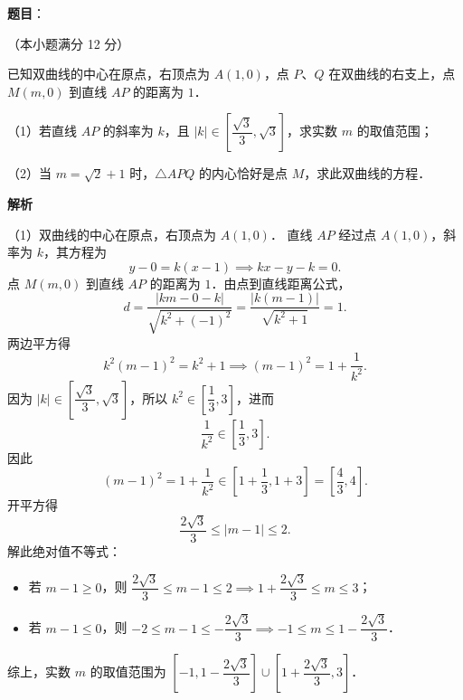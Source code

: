 \begin{answer}

\textbf{题目}：

（本小题满分 12 分）

已知双曲线的中心在原点，右顶点为 $A(1, 0)$，点 $P$、$Q$ 在双曲线的右支上，点 $M(m, 0)$ 到直线 $AP$ 的距离为 $1$．

（1）若直线 $AP$ 的斜率为 $k$，且 $|k| \in \left[\dfrac{\sqrt{3}}{3}, \sqrt{3}\right]$，求实数 $m$ 的取值范围；

（2）当 $m = \sqrt{2} + 1$ 时，$\triangle APQ$ 的内心恰好是点 $M$，求此双曲线的方程．

\textbf{解析}

（1）双曲线的中心在原点，右顶点为 $A(1, 0)$．
直线 $AP$ 经过点 $A(1, 0)$，斜率为 $k$，其方程为
\nopagebreak[4]
\[
y - 0 = k(x - 1) \implies kx - y - k = 0.
\]
点 $M(m, 0)$ 到直线 $AP$ 的距离为 $1$．由点到直线距离公式，
\nopagebreak[4]
\[
d = \frac{|k m - 0 - k|}{\sqrt{k^2 + (-1)^2}} = \frac{|k(m - 1)|}{\sqrt{k^2 + 1}} = 1.
\]
两边平方得
\nopagebreak[4]
\[
k^2(m - 1)^2 = k^2 + 1 \implies (m - 1)^2 = 1 + \frac{1}{k^2}.
\]
因为 $|k| \in \left[\dfrac{\sqrt{3}}{3}, \sqrt{3}\right]$，所以 $k^2 \in \left[\dfrac{1}{3}, 3\right]$，进而
\nopagebreak[4]
\[
\frac{1}{k^2} \in \left[\frac{1}{3}, 3\right].
\]
因此
\nopagebreak[4]
\[
(m - 1)^2 = 1 + \frac{1}{k^2} \in \left[1 + \frac{1}{3}, 1 + 3\right] = \left[\frac{4}{3}, 4\right].
\]
开平方得
\nopagebreak[4]
\[
\frac{2\sqrt{3}}{3} \leqslant |m - 1| \leqslant 2.
\]
解此绝对值不等式：
\begin{itemize}
\item 若 $m - 1 \geqslant 0$，则 $\dfrac{2\sqrt{3}}{3} \leqslant m - 1 \leqslant 2 \implies 1 + \dfrac{2\sqrt{3}}{3} \leqslant m \leqslant 3$；
\item 若 $m - 1 \leqslant 0$，则 $-2 \leqslant m - 1 \leqslant -\dfrac{2\sqrt{3}}{3} \implies -1 \leqslant m \leqslant 1 - \dfrac{2\sqrt{3}}{3}$．
\end{itemize}
综上，实数 $m$ 的取值范围为 $\left[-1, 1 - \dfrac{2\sqrt{3}}{3}\right] \cup \left[1 + \dfrac{2\sqrt{3}}{3}, 3\right]$．


\end{answer}

